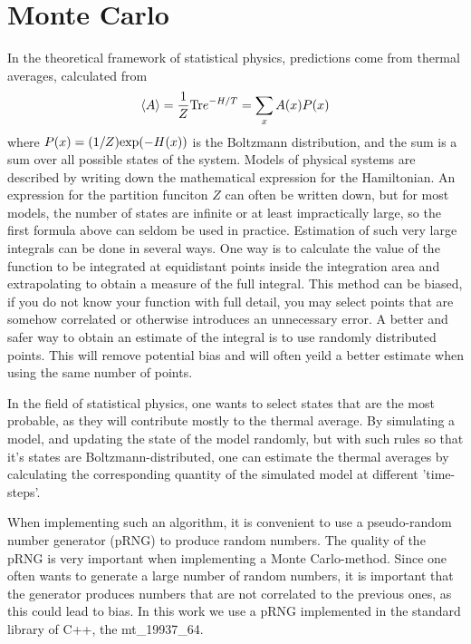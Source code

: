 %
\section{Monte Carlo}
In the theoretical framework of statistical physics, predictions come from thermal averages, calculated from 
\begin{equation}
  \langle A\rangle = \frac{1}{Z}\textrm{Tr} e^{-H/T} = \sum_x A(x) P(x)
  \label{MC:eq:avg}
\end{equation}
where  $P(x) = (1/Z)\textrm{exp}(-H(x))$ is the Boltzmann distribution, and the sum is a sum over all possible states of the system. 
Models of physical systems are described by writing down the mathematical expression for the Hamiltonian.
An expression for the partition funciton $Z$ can often be written down, but for most models, the number of states are infinite or at least impractically large, so the first formula above can seldom be used in practice.
Estimation of such very large integrals can be done in several ways.
One way is to calculate the value of the function to be integrated at equidistant points inside the integration area and extrapolating to obtain a measure of the full integral.
This method can be biased, if you do not know your function with full detail, you may select points that are somehow correlated or otherwise introduces an unnecessary error.
A better and safer way to obtain an estimate of the integral is to use randomly distributed points.
This will remove potential bias and will often yeild a better estimate when using the same number of points.

In the field of statistical physics, one wants to select states that are the most probable, as they will contribute mostly to the thermal average. By simulating a model, and updating the state of the model randomly, but with such rules so that it's states are Boltzmann-distributed, one can estimate the thermal averages by calculating the corresponding quantity of the simulated model at different 'time-steps'.

When implementing such an algorithm, it is convenient to use a pseudo-random number generator (pRNG) to produce random numbers.
The quality of the pRNG is very important when implementing a Monte Carlo-method.
Since one often wants to generate a large number of random numbers, it is important that the generator produces numbers that are not correlated to the previous ones, as this could lead to bias. 
In this work we use a pRNG implemented in the standard library of C++, the mt_19937_64.

